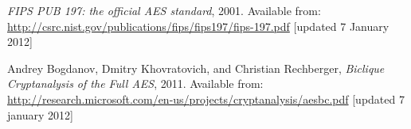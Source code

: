 \documentclass{report}
\begin{document}
%
%
%
%   
%

\begin{thebibliography}{9}

    \emph{FIPS PUB 197: the official AES standard}, 2001. Available from: \url{http://csrc.nist.gov/publications/fips/fips197/fips-197.pdf} [updated 7 January 2012]

    Andrey Bogdanov, Dmitry Khovratovich, and Christian Rechberger, \emph{Biclique Cryptanalysis of the Full AES}, 2011. Available from: \url{http://research.microsoft.com/en-us/projects/cryptanalysis/aesbc.pdf} [updated 7 january 2012]

\end{thebibliography}
\end{document}
